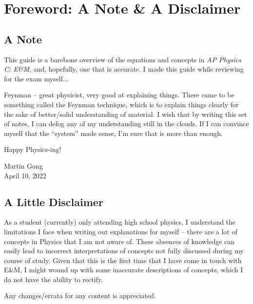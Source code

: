 \chapter*{Foreword: A Note \& A Disclaimer}

\section{A Note} 

This guide is a barebone overview of the equations and concepts in \textit{AP Physics C: E\&M}, and, hopefully, one that is accurate. I made this guide while reviewing for the exam myself...

Feynman -- great physicist, very good at explaining things. There came to be something called the Feynman technique, which is to explain things clearly for the sake of better/solid understanding of material. I wish that by writing this set of notes, I can defog any of my understanding still in the clouds. If I can convince myself that the ``system'' made sense, I'm sure that is more than enough.

Happy Physics-ing!

\begin{flushright}
    Martin Gong\\
    April 10, 2022
\end{flushright}

\section{A Little Disclaimer}

As a student (currently) only attending high school physics, I understand the limitations I face when writing out explanations for myself -- there are a lot of concepts in Physics that I am not aware of. These absences of knowledge can easily lead to incorrect interpretations of concepts not fully discussed during my course of study. Given that this is the first time that I have come in touch with E\&M, I might wound up with some inaccurate descriptions of concepts, which I do not have the ability to rectify.

Any changes/errata for any content is appreciated.

\bigskip

